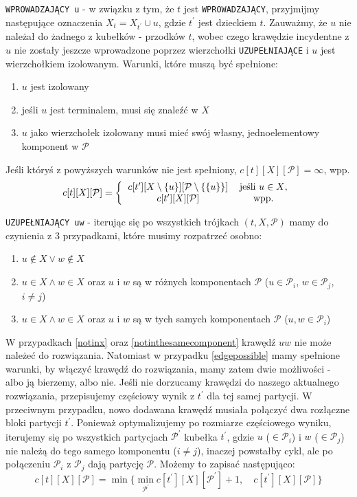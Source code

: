 \documentclass[12pt, oneside]{report}
\begin{document}
\texttt{WPROWADZAJĄCY u} - w związku z tym, że $t$ jest \texttt{WPROWADZAJĄCY}, przyjmijmy następujące oznaczenia $X_t = X_{t^{\prime}} \cup u$, gdzie $t^{\prime}$ jest dzieckiem $t$. Zauważmy, że $u$ nie należał do żadnego z kubełków - przodków $t$, wobec czego krawędzie incydentne z $u$ nie zostały jeszcze wprowadzone poprzez wierzchołki \texttt{UZUPEŁNIAJĄCE} i $u$ jest wierzchołkiem izolowanym. Warunki, które muszą być spełnione:
\begin{enumerate}[label=(\roman*)]
\item $u$ jest izolowany
\item jeśli $u$ jest terminalem, musi się znaleźć w $X$
\item $u$ jako wierzchołek izolowany musi mieć swój własny, jednoelementowy komponent w $\mathcal{P}$
\end{enumerate}
Jeśli któryś z powyższych warunków nie jest spełniony, $c[t][X][\mathcal{P}] = \infty$, wpp. 
\[
c[t][X][\mathcal{P}] =  
\left \{
  \begin{tabular}{ccc}
  $c[t^{\prime}][X \setminus \{u\}][\mathcal{P} \setminus \{\{u\}\}]$ & jeśli $u \in X$,\\
  $c[t^{\prime}][X][\mathcal{P}]$ & wpp.
  \end{tabular}
\right. 
\]
\newline

\texttt{UZUPEŁNIAJĄCY uw} - iterując się po wszystkich trójkach $(t, X, \mathcal{P})$ mamy do czynienia z 3 przypadkami, które musimy rozpatrzeć osobno:

\begin{enumerate}
\item \label{notinx} $u \notin X \lor w \notin X$
\item \label{notinthesamecomponent} $u \in X \land w \in X$ oraz $u$ i $w$ są w różnych komponentach $\mathcal{P}$ ($u \in \mathcal{P}_i$, $w \in \mathcal{P}_j$, $i \neq j$)
\item \label{edgepossible} $u \in X \land w \in X$ oraz $u$ i $w$ są w tych samych komponentach $\mathcal{P}$ ($u,w \in \mathcal{P}_i$)
\end{enumerate} 
W przypadkach \ref{notinx} oraz \ref{notinthesamecomponent} krawędź $uw$ nie może należeć do rozwiązania. Natomiast w przypadku \ref{edgepossible} mamy spełnione warunki, by włączyć krawędź do rozwiązania, mamy zatem dwie możliwości - albo ją bierzemy, albo nie. Jeśli nie dorzucamy krawędzi do naszego aktualnego rozwiązania, przepisujemy częściowy wynik z $t^{\prime}$ dla tej samej partycji. W przeciwnym przypadku, nowo dodawana krawędź musiała połączyć dwa rozłączne bloki partycji $t^{\prime}$. Ponieważ optymalizujemy po rozmiarze częściowego wyniku, iterujemy się po wszystkich partycjach $\mathcal{P}^{\prime}$ kubełka $t^{\prime}$, gdzie $u$ ($\in \mathcal{P}_i$) i $w$ ($\in \mathcal{P}_j$) nie należą do tego samego komponentu ($i \neq j$), inaczej powstałby cykl, ale po połączeniu $\mathcal{P}_i$ z $\mathcal{P}_j$ dają partycję $\mathcal{P}$. Możemy to zapisać następująco:
$$c[t][X][\mathcal{P}] = \min \big\{ \min\limits_{\mathcal{P}^{\prime}} c[t^{\prime}][X][\mathcal{P}^{\prime}] + 1, \quad c[t^{\prime}][X][\mathcal{P}] \big\}$$
\end{document}

